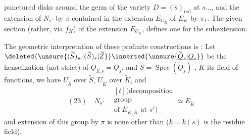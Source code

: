 punctured disks around the germ of the
variety $D=(\overline s)_{\mathrm{red}}$ at $s\dots$, and the extension
of $N_{s'}$ by $\pi$ contained in the extension $E_{U_K}$ of
$E_K$ by $\pi_1$.
The given section (rather,
 via $f_K$) of the extension $E_{U_K}$,
defines one for the subextension. 

The geometric interpretation of these profinite constructions
is   : Let
$\deleted{\unsure{(\widetilde S)_w|(\widetilde S)_s|\widetilde Z}}\inserted{\unsure{\widetilde{\underline O}_s|\underline O_s}}$ be the henselization (not strict) of $\underline O_{S,s}=\underline O_s$,
and $\widetilde S=\operatorname{Spec}(\widetilde{\underline O}_s)$ , $\widetilde K$ its field of
functions, we have $U_{\widetilde S}$ over $\widetilde S$, $U_{\widetilde K}$ over $\widetilde K$,
and 
\[
(23)\quad N_{s'}\quad
\begin{gathered}[t]
\text{(decomposition}\\
\text{group}\\
\text{of }E_{K,\overline K}\text{ at }s')
\end{gathered}
\simeq E_{\widetilde K}
\]
and   extension of this group by $\pi$
is none other than
($k=k(s)$ is the residue field).
